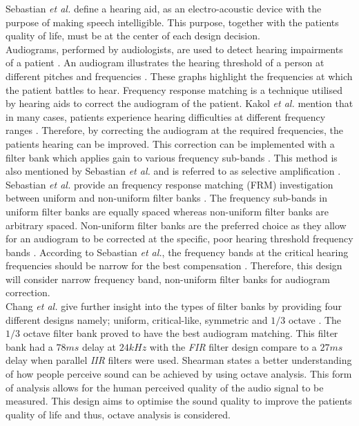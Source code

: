 \documentclass[11pt,onecolumn]{witseiepaper}
\begin{document}
\noindent Sebastian \textit{et al.} \cite{sebastian} define a hearing aid, as an electro-acoustic device with the purpose of making speech intelligible. This purpose, together with the patients quality of life, must be at the center of each design decision.\\
\newline
\noindent Audiograms, performed by audiologists, are used to detect hearing impairments of a patient \cite{audiogram}. An audiogram illustrates the hearing threshold of a person at different pitches and frequencies \cite{sebastian}. These graphs highlight the frequencies at which the patient battles to hear. Frequency response matching is a technique utilised by hearing aids to correct the audiogram of the patient. Kakol \textit{et al.} mention that in many cases, patients experience hearing difficulties at different frequency ranges \cite{diffMeth}. Therefore, by correcting the audiogram at the required frequencies, the patients hearing can be improved. This correction can be implemented with a filter bank which applies gain to various frequency sub-bands \cite{diffMeth}. This method is also mentioned by Sebastian \textit{et al.} and is referred to as selective amplification \cite{sebastian}.\\
\newline
\noindent Sebastian \textit{et al.} provide an frequency response matching (FRM) investigation between uniform and non-uniform filter banks \cite{sebastian}. The frequency sub-bands in uniform filter banks are equally spaced whereas non-uniform filter banks are arbitrary spaced. Non-uniform filter banks are the preferred choice as they allow for an audiogram to be corrected at the specific, poor hearing threshold frequency bands \cite{sebastian}. According to Sebastian \textit{et al.}, the frequency bands at the critical hearing frequencies should be narrow for the best compensation \cite{sebastian}. Therefore, this design will consider narrow frequency band, non-uniform filter banks for audiogram correction. \\
\newline
\noindent Chang \textit{et al.} give further insight into the types of filter banks by providing four different designs namely; uniform, critical-like, symmetric and $1/3$ octave \cite{chang}. The $1/3$ octave filter bank proved to have the best audiogram matching. This filter bank had a $78ms$ delay at $24kHz$ with the \textit{FIR} filter design compare to a $27ms$ delay when parallel \textit{IIR} filters were used. Shearman \cite{octave} states a better understanding of how people perceive sound can be achieved by using octave analysis. This form of analysis allows for the human perceived quality of the audio signal to be measured. This design aims to optimise the sound quality to improve the patients quality of life and thus, octave analysis is considered.\\
\end{document}
